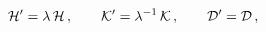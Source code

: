 \begin{equation}\label{boro1.10}
{\cal H}'=\lambda\,{\cal H} \,,\qquad{\cal K}'=\lambda^{-1}\,{\cal K}\,,
\qquad{\cal D}'={\cal D}\, ,
\end{equation}

